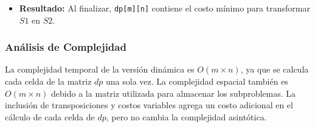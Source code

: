 \begin{itemize}
    \item \textbf{Resultado:} Al finalizar, \texttt{dp[m][n]} contiene el costo mínimo para transformar \( S1 \) en \( S2 \).
\end{itemize}

\subsubsection{Análisis de Complejidad}
La complejidad temporal de la versión dinámica es \( O(m \times n) \), ya que se calcula cada celda de la matriz \( dp \) una sola vez. La complejidad espacial también es \( O(m \times n) \) debido a la matriz utilizada para almacenar los subproblemas. La inclusión de transposiciones y costos variables agrega un costo adicional en el cálculo de cada celda de \( dp \), pero no cambia la complejidad asintótica.
